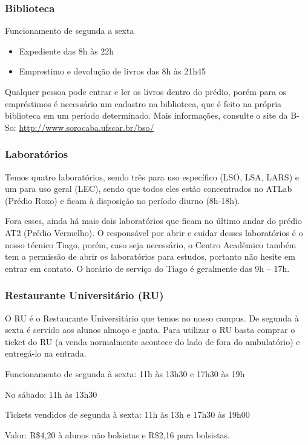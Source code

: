 \subsubsection{Biblioteca}
\noindent Funcionamento de segunda a sexta
\begin{itemize}
  \item Expediente das 8h às 22h
  \item Emprestimo e devolução de livros das 8h às 21h45
\end{itemize}
\noindent Qualquer pessoa pode entrar e ler os livros dentro do prédio, porém para os empréstimos é necessário um cadastro na biblioteca, que é feito na própria biblioteca em um período determinado.
\newline \newline Mais informações, consulte o site da B-So:
\url{http://www.sorocaba.ufscar.br/bso/}

\subsubsection{Laboratórios}
Temos quatro laboratórios, sendo três para uso específico (LSO, LSA, LARS) e um para uso geral (LEC), sendo que todos eles estão
concentrados no ATLab (Prédio Roxo) e ficam à disposição no período diurno (8h-18h).

Fora esses, ainda há mais dois laboratórios que ficam no último andar do prédio AT2 (Prédio Vermelho).
O responsável por abrir e cuidar desses laboratórios é o nosso técnico Tiago,
porém, caso seja necessário, o Centro Acadêmico também tem a permissão de
abrir os laboratórios para estudos, portanto não hesite em entrar em contato.
O horário de serviço do Tiago é geralmente das 9h -- 17h.

\subsubsection{Restaurante Universitário (RU)}
O RU é o Restaurante Universitário que temos no nosso campus. De segunda à sexta é servido aos alunos almoço e janta. Para utilizar o RU basta comprar o ticket do RU (a venda normalmente acontece do lado de fora do ambulatório) e entregá-lo na entrada.

Funcionamento de segunda à sexta: 11h às 13h30 e 17h30 às 19h

No sábado: 11h às 13h30

Tickets vendidos de segunda à sexta: 11h às 13h e 17h30 às 19h00

Valor: R\$4,20 à alunos não bolsistas e R\$2,16 para bolsistas.

